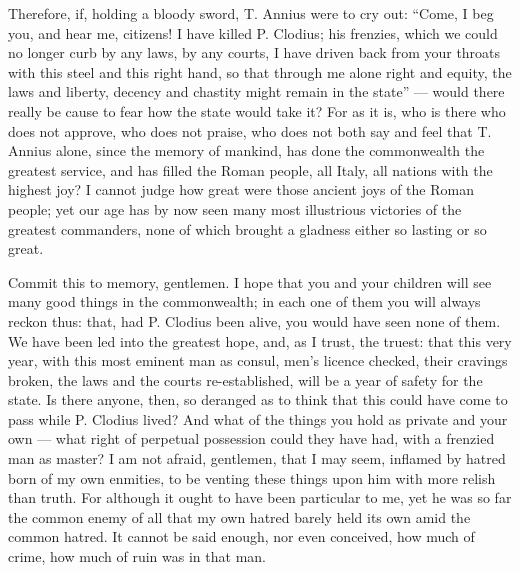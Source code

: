  Therefore, if, holding a bloody sword, T. Annius were to cry out: ``Come, I beg you, and hear me, citizens! I have killed P. Clodius; his frenzies, which we could no longer curb by any laws, by any courts, I have driven back from your throats with this steel and this right hand, so that through me alone right and equity, the laws and liberty, decency and chastity might remain in the state'' --- would there really be cause to fear how the state would take it? For as it is, who is there who does not approve, who does not praise, who does not both say and feel that T. Annius alone, since the memory of mankind, has done the commonwealth the greatest service, and has filled the Roman people, all Italy, all nations with the highest joy? I cannot judge how great were those ancient joys of the Roman people; yet our age has by now seen many most illustrious victories of the greatest commanders, none of which brought a gladness either so lasting or so great.

 Commit this to memory, gentlemen. I hope that you and your children will see many good things in the commonwealth; in each one of them you will always reckon thus: that, had P. Clodius been alive, you would have seen none of them. We have been led into the greatest hope, and, as I trust, the truest: that this very year, with this most eminent man as consul, men's licence checked, their cravings broken, the laws and the courts re-established, will be a year of safety for the state. Is there anyone, then, so deranged as to think that this could have come to pass while P. Clodius lived? And what of the things you hold as private and your own --- what right of perpetual possession could they have had, with a frenzied man as master? I am not afraid, gentlemen, that I may seem, inflamed by hatred born of my own enmities, to be venting these things upon him with more relish than truth. For although it ought to have been particular to me, yet he was so far the common enemy of all that my own hatred barely held its own amid the common hatred. It cannot be said enough, nor even conceived, how much of crime, how much of ruin was in that man.

